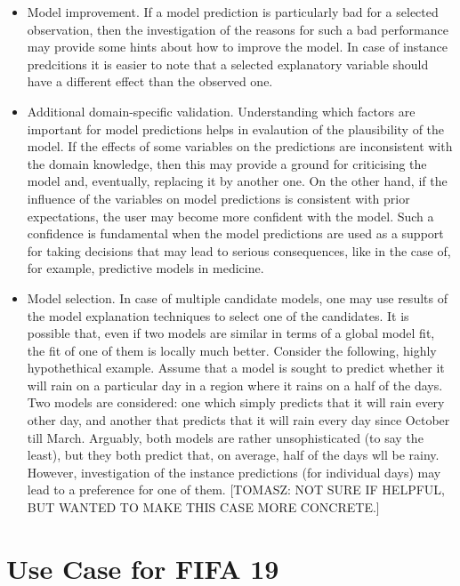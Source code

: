 \documentclass[12pt,]{krantz}
\begin{document}
\begin{itemize}
\item
  Model improvement. If a model prediction is particularly bad for a selected observation, then the investigation of the reasons for such a bad performance may provide some hints about how to improve the model. In case of instance predcitions it is easier to note that a selected explanatory variable should have a different effect than the observed one.
\item
  Additional domain-specific validation. Understanding which factors are important for model predictions helps in evalaution of the plausibility of the model. If the effects of some variables on the predictions are inconsistent with the domain knowledge, then this may provide a ground for criticising the model and, eventually, replacing it by another one. On the other hand, if the influence of the variables on model predictions is consistent with prior expectations, the user may become more confident with the model. Such a confidence is fundamental when the model predictions are used as a support for taking decisions that may lead to serious consequences, like in the case of, for example, predictive models in medicine.
\item
  Model selection. In case of multiple candidate models, one may use results of the model explanation techniques to select one of the candidates. It is possible that, even if two models are similar in terms of a global model fit, the fit of one of them is locally much better. Consider the following, highly hypothethical example. Assume that a model is sought to predict whether it will rain on a particular day in a region where it rains on a half of the days. Two models are considered: one which simply predicts that it will rain every other day, and another that predicts that it will rain every day since October till March. Arguably, both models are rather unsophisticated (to say the least), but they both predict that, on average, half of the days wll be rainy. However, investigation of the instance predictions (for individual days) may lead to a preference for one of them. {[}TOMASZ: NOT SURE IF HELPFUL, BUT WANTED TO MAKE THIS CASE MORE CONCRETE.{]}
\end{itemize}

\hypertarget{UseCaseFIFA}{%
\section{Use Case for FIFA 19}\label{UseCaseFIFA}}
\end{document}
